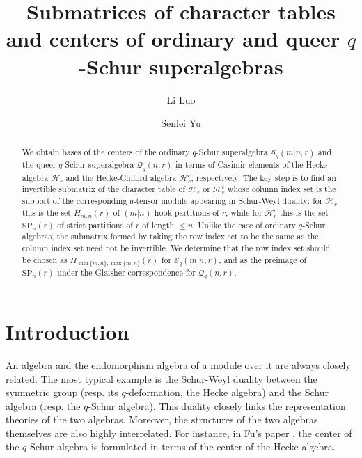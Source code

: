 \documentclass[11pt]{amsart}
\title[Centers of $q$-Schur superalgebras]
{Submatrices of character tables and centers of ordinary and queer $q$-Schur superalgebras}
\author[Li Luo]{Li Luo}
\author[Senlei Yu]{Senlei Yu}
\date{}
\numberwithin{equation}{section}
\theoremstyle{plain}
\theoremstyle{definition}
\theoremstyle{remark}
\begin{document}
\begin{abstract}
We obtain bases of the centers of the ordinary $q$-Schur superalgebra $\mathcal{S}_q(m|n,r)$ and the queer $q$-Schur superalgebra $\mathcal{Q}_q(n,r)$ in terms of Casimir elements of the Hecke algebra $\mathcal{H}_r$ and the Hecke-Clifford algebra $\mathcal{H}_r^c$, respectively. The key step is to find an invertible submatrix of the character table of $\mathcal{H}_r$ or $\mathcal{H}_r^c$ whose column index set is the support of the corresponding $q$-tensor module appearing in Schur-Weyl duality: for $\mathcal{H}_r$ this is the set $H_{m,n}(r)$ of $(m|n)$-hook partitions of $r$, while for $\mathcal{H}_r^c$ this is the set $\mathrm{SP}_n(r)$ of strict partitions of $r$ of length $\leq n$. Unlike the case of ordinary $q$-Schur algebras, the submatrix formed by taking the row index set to be the same as the column index set need not be invertible. We determine that the row index set should be chosen as $H_{\min\{m,n\},\max\{m,n\}}(r)$ for $\mathcal{S}_q(m|n,r)$, and as the preimage of $\mathrm{SP}_n(r)$ under the Glaisher correspondence for $\mathcal{Q}_q(n,r)$. 
\end{abstract}

\maketitle


\section{Introduction}

An algebra and the endomorphism algebra of a module over it are always closely related. The most typical example is the Schur-Weyl duality between the symmetric group (resp. its $q$-deformation, the Hecke algebra) and the Schur algebra (resp. the $q$-Schur algebra). This duality closely links the representation theories of the two algebras. Moreover, the structures of the two algebras themselves are also highly interrelated. For instance, in Fu's paper \cite{Fu21}, the center of the $q$-Schur algebra is formulated in terms of the center of the Hecke algebra.
\end{document}
